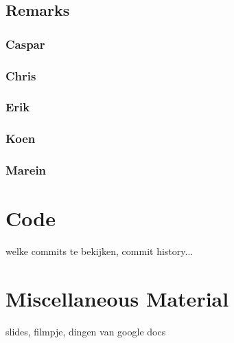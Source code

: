 \documentclass[10pt, abstracton, twocolumn]{scrartcl}
\begin{document}
\begin{appendices}
\subsection{Remarks}


\subsubsection{Caspar}


\subsubsection{Chris}


\subsubsection{Erik}


\subsubsection{Koen}


\subsubsection{Marein}


\section{Code}
welke commits te bekijken, commit history...

\section{Miscellaneous Material}
slides, filmpje, dingen van google docs

\end{appendices}
\end{document}

